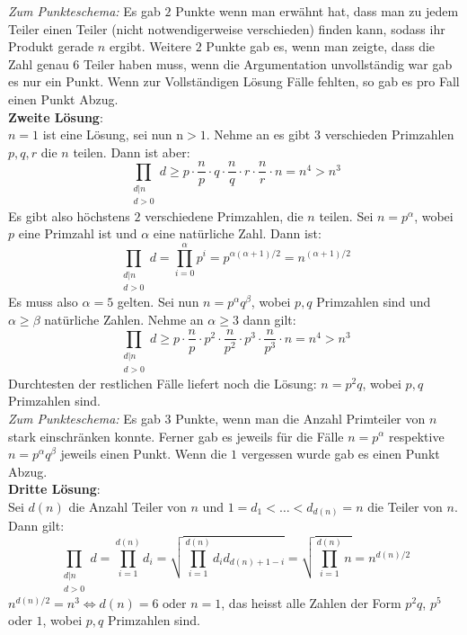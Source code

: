 \documentclass[12pt,a4paper]{article}
\theoremstyle{plain}
\theoremstyle{definition}
\theoremstyle{remark}
\begin{document}
\begin{enumerate}
\emph{Zum Punkteschema:} Es gab $2$ Punkte wenn man erwähnt hat, dass man zu jedem Teiler einen Teiler (nicht notwendigerweise verschieden) finden kann, sodass ihr Produkt gerade $n$ ergibt. Weitere $2$ Punkte gab es, wenn man zeigte, dass die Zahl genau $6$ Teiler haben muss, wenn die Argumentation unvollständig war gab es nur ein Punkt. Wenn zur Vollständigen Lösung Fälle fehlten, so gab es pro Fall einen Punkt Abzug.\\

\textbf{Zweite Lösung}:\\
$n=1$ ist eine Lösung, sei nun n$>1$. Nehme an es gibt $3$ verschieden Primzahlen $p,q,r$ die $n$ teilen. Dann ist aber:
$$\prod_{\substack{ d|n \\ d>0 }}d \ge p \cdot \frac{n}{p} \cdot q \cdot \frac{n}{q} \cdot r \cdot \frac{n}{r} \cdot n = n^4>n^3$$
Es gibt also höchstens $2$ verschiedene Primzahlen, die $n$ teilen. Sei $n=p^{\alpha}$, wobei $p$ eine Primzahl ist und $\alpha$ eine natürliche Zahl. Dann ist:
$$\prod_{\substack{ d|n \\ d>0 }}d = \prod_{i=0}^{\alpha}p^i=p^{\alpha(\alpha+1)/2}=n^{(\alpha+1)/2}$$
Es muss also $\alpha=5$ gelten. Sei nun $n=p^{\alpha}q^{\beta}$, wobei $p,q$ Primzahlen sind und $\alpha\ge\beta$ natürliche Zahlen. Nehme an $\alpha\ge 3$ dann gilt:
$$\prod_{\substack{ d|n \\ d>0 }}d \ge p \cdot \frac{n}{p} \cdot p^2 \cdot \frac{n}{p^2} \cdot p^3 \cdot \frac{n}{p^3} \cdot n = n^4>n^3$$
Durchtesten der restlichen Fälle liefert noch die Lösung: $n=p^2q$, wobei $p,q$ Primzahlen sind.\\

\emph{Zum Punkteschema:} Es gab $3$ Punkte, wenn man die Anzahl Primteiler von $n$ stark einschränken konnte. Ferner gab es jeweils für die Fälle $n=p^{\alpha}$ respektive $n=p^{\alpha}q^{\beta}$ jeweils einen Punkt. Wenn die $1$ vergessen wurde gab es einen Punkt Abzug.\\

\textbf{Dritte Lösung}:\\
Sei $d(n)$ die Anzahl Teiler von $n$ und $1=d_1<\dots<d_{d(n)}=n$ die Teiler von $n$. Dann gilt:
$$\prod_{\substack{ d|n \\ d>0 }}d=\prod_{i=1}^{d(n)}d_i=\sqrt{\prod_{i=1}^{d(n)}d_id_{d(n)+1-i}}=\sqrt{\prod_{i=1}^{d(n)}n}=n^{d(n)/2}$$
$n^{d(n)/2}=n^3 \Leftrightarrow d(n)=6 \text{ oder } n=1$, das heisst alle Zahlen der Form $p^2q$, $p^5$ oder $1$, wobei $p,q$ Primzahlen sind.\\


\end{enumerate}
\end{document}
